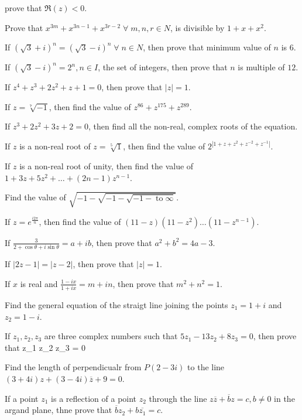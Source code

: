   prove that $\Re(z) < 0$.
\item Prove that $x^{3m} + x^{3n - 1} + x^{3r - 2}\;\forall\;m,n,r\in N$, is divisible by $1 + x + x^2$.
\item If $(\sqrt{3} + i)^n = (\sqrt{3} - i)^n\;\forall\;n\in N$, then prove that minimum value of $n$ is $6$.
\item If $(\sqrt{3} - i)^n = 2^n, n\in I$, the set of integers, then prove that $n$ is multiple of $12$.
\item If $z^4 + z^3 + 2z^2 + z + 1 = 0$, then prove that $|z| = 1$.
\item If $z = \sqrt[7]{-1}$, then find the value of $z^{86} + z^{175} + z^{289}$.
\item If $z^3 + 2z^2 + 3z + 2 = 0$, then find all the non-real, complex roots of the equation.
\item If $z$ is a non-real root of $z = \sqrt[5]{1}$, then find the value of $2^{|1 + z + z^2 + z^{-2} + z^{-1}|}$.
\item If $z$ is a non-real root of unity, then find the value of $1 + 3z + 5z^2 + \ldots + (2n - 1)z^{n - 1}$.
\item Find the value of $\sqrt{-1 - \sqrt{-1 - \sqrt{-1 - \;\text{to}\; \infty}}}$.
\item If $z = e^{\frac{i2\pi}{n}}$, then find the value of $(11 - z)(11 - z^2)\ldots(11 - z^{n - 1})$.
\item If $\frac{3}{2 + \cos\theta + i\sin\theta} = a + ib$, then prove that $a^2 + b^2 = 4a - 3$.
\item If $|2z - 1| = |z - 2|$, then prove that $|z| = 1$.
\item If $x$ is real and $\frac{1 - ix}{1 + ix} = m + in$, then prove that $m^2 + n^2 = 1$.
\item Find the general equation of the straigt line joining the points $z_1 = 1 + i$ and $z_2 = 1 - i$.
\item If $z_1, z_2, z_3$ are three complex numbers such that $5z_1 - 13z_2 + 8z_3 = 0$, then prove that \startformula \startdeterminant \NC z_1 \NC
   \NR\NC z_2 \NC {} \NR\NC z_3 \NC {} \NR\stopdeterminant = 0\stopformula
\item Find the length of perpendicualr from $P(2 - 3i)$ to the line $(3 + 4i)z + (3 - 4i)\overline{z} + 9 = 0$.
\item If a point $z_1$ is a reflection of a point $z_2$ through the line $z\overline{z} + \overline{b}z = c, b\neq 0$ in the argand
  plane, thne prove that $\overline{b}z_2 + b\overline{z_1} = c$.
